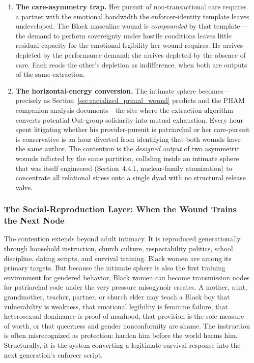 \begin{enumerate}
    \item \textbf{The care-asymmetry trap.} Her pursuit of non-transactional care requires a partner with the emotional bandwidth the enforcer-identity template leaves undeveloped. The Black masculine wound is \textit{compounded} by that template---the demand to perform sovereignty under hostile conditions leaves little residual capacity for the emotional legibility her wound requires. He arrives depleted by the performance demand; she arrives depleted by the absence of care. Each reads the other's depletion as indifference, when both are outputs of the same extraction.
    
    \item \textbf{The horizontal-energy conversion.} The intimate sphere becomes---precisely as Section~\ref{sec:racialized_primal_wound} predicts and the PHAM companion analysis documents---the site where the extraction algorithm converts potential Out-group solidarity into mutual exhaustion. Every hour spent litigating whether his provider-pursuit is patriarchal or her care-pursuit is conservative is an hour diverted from identifying that both wounds have the same author. The contention is the \textit{designed output} of two asymmetric wounds inflicted by the same partition, colliding inside an intimate sphere that was itself engineered (Section~4.4.1, nuclear-family atomization) to concentrate all relational stress onto a single dyad with no structural release valve.
\end{enumerate}

\subsubsection*{The Social-Reproduction Layer: When the Wound Trains the Next Node}

The contention extends beyond adult intimacy. It is reproduced generationally through household instruction, church culture, respectability politics, school discipline, dating scripts, and survival training. Black women are among its primary targets. But because the intimate sphere is also the first training environment for gendered behavior, Black women can become transmission nodes for patriarchal code under the very pressure misogynoir creates. A mother, aunt, grandmother, teacher, partner, or church elder may teach a Black boy that vulnerability is weakness, that emotional legibility is feminine failure, that heterosexual dominance is proof of manhood, that provision is the sole measure of worth, or that queerness and gender nonconformity are shame. The instruction is often misrecognized as protection: harden him before the world harms him. Structurally, it is the system converting a legitimate survival response into the next generation's enforcer script.

